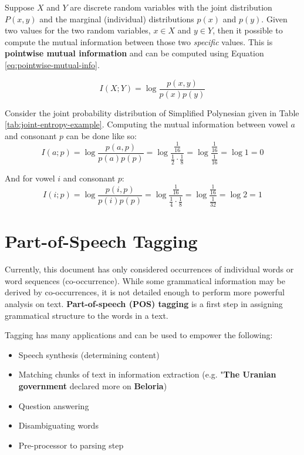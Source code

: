 \documentclass{article}
\begin{document}
Suppose $X$ and $Y$ are discrete random variables with the joint distribution $P(x, y)$ and the marginal (individual) distributions $p(x)$ and $p(y)$. Given two values for the two random variables, $x \in X$ and $y \in Y$, then it possible to compute the mutual information between those two \textit{specific} values. This is \textbf{pointwise mutual information} and can be computed using Equation \ref{eq:pointwise-mutual-info}.

\begin{equation}
	I(X;Y) = \log \frac{p(x,y)}{p(x)p(y)}
	\label{eq:pointwise-mutual-info}
\end{equation}

Consider the joint probability distribution of Simplified Polynesian given in Table \ref{tab:joint-entropy-example}. Computing the mutual information between vowel $a$ and consonant $p$ can be done like so:
\begin{equation}
	I(a;p) = \log \frac{p(a, p)}{p(a)p(p)} = \log \frac{\frac{1}{16}}{\frac{1}{2} \cdot \frac{1}{8}} = \log \frac{\frac{1}{16}}{\frac{1}{16}} = \log 1 = 0
\end{equation}

And for vowel $i$ and consonant $p$:
\begin{equation}
	I(i;p) = \log \frac{p(i, p)}{p(i)p(p)} = \log \frac{\frac{1}{16}}{\frac{1}{4} \cdot \frac{1}{8}} = \log \frac{\frac{1}{16}}{\frac{1}{32}} = \log 2 = 1
\end{equation}

\section{Part-of-Speech Tagging}

Currently, this document has only considered occurrences of individual words or word sequences (co-occurrence). While some grammatical information may be derived by co-occurrences, it is not detailed enough to perform more powerful analysis on text. \textbf{Part-of-speech (POS) tagging} is a first step in assigning grammatical structure to the words in a text.

Tagging has many applications and can be used to empower the following:
\begin{itemize}
	\item Speech synthesis (determining content)
	\item Matching chunks of text in information extraction (e.g. "\textbf{The Uranian government} declared more on \textbf{Beloria})
	\item Question answering
	\item Disambiguating words
	\item Pre-processor to parsing step
\end{itemize}
\end{document}
